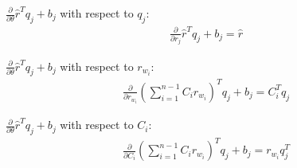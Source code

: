 $\frac{\partial}{\partial \theta}\hat{r}^T q_{j} +b_{j}$ with respect to $q_j$:
\begin{align*}
\frac{\partial}{\partial r_j}\hat{r}^T q_{j} +b_{j} = \hat{r}
\end{align*}

$\frac{\partial}{\partial \theta}\hat{r}^T q_{j} +b_{j}$ with respect to $r_{w_i}$:
\begin{align*}
\frac{\partial}{\partial r_{w_i}}(\sum_{i=1}^{n-1} C_i r_{w_i})^T q_{j} +b_{j} = C_i^T q_j
\end{align*}

$\frac{\partial}{\partial \theta}\hat{r}^T q_{j} +b_{j}$ with respect to $C_i$:
\begin{align*}
\frac{\partial}{\partial C_i}(\sum_{i=1}^{n-1} C_i r_{w_i})^T q_{j} +b_{j} = r_{w_i} q_j^T
\end{align*}


